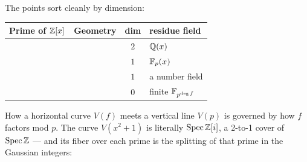 The points sort cleanly by dimension:

\begin{center}
\begin{tabular}{@{}L{3.5cm}L{4.6cm}cl@{}}
\toprule
\textcolor{algc}{Prime of $\mathbb{Z}[x]$} & \textcolor{accentB}{Geometry} & \textbf{dim} & \textbf{residue field}\\
\midrule
{} &  & $2$ & $\mathbb{Q}(x)$\\
 &  & $1$ & $\mathbb{F}_p(x)$\\
 &  & $1$ & a number field\\
 &  & $0$ & finite $\mathbb{F}_{p^{\deg\bar f}}$\\
\bottomrule
\end{tabular}
\end{center}

\begin{intubox}
How a horizontal curve $V(f)$ meets a vertical line $V(p)$ is governed by how $f$
factors mod $p$. The curve $V(x^2+1)$ is literally $\operatorname{Spec}\mathbb{Z}[i]$, a 2-to-1 cover of
$\operatorname{Spec}\mathbb{Z}$ --- and its fiber over each prime is the splitting of that prime in the
Gaussian integers:
\end{intubox}

